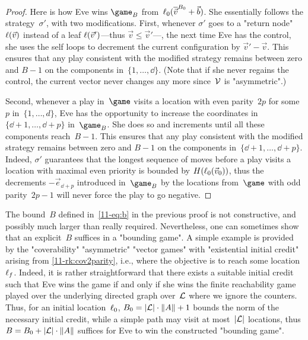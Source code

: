\begin{proof}
  Here is how Eve wins $\game_B$ from~$\loc_0(\capp[B_0]v+\vec b)$.
  She essentially follows the strategy~$\sigma'$, with two
  modifications.  First, whenever $\sigma'$ goes to a "return node"
  $\loc(\vec v)$ instead of a leaf $\loc(\vec v')$---thus $\vec
  v\leq\vec v'$---, the next time Eve has the control, she uses the
  self loops to decrement the current configuration by $\vec v'-\vec
  v$.  This ensures that any play consistent with the modified
  strategy remains between zero and $B-1$ on the components
  in~$\{1,\dots,\dd\}$.  (Note that if she never regains the control,
  the current vector never changes any more since~$\?V$ is
  "asymmetric".)

  Second, whenever a play in~$\game$ visits a location with even
  parity~$2p$ for some~$p$ in~$\{1,\dots,d\}$, Eve has the opportunity
  to increase the coordinates in~$\{\dd+1,\dots,\dd+p\}$ in~$\game_B$.
  She does so and increments until all these components reach~$B-1$.
  This ensures that any play consistent with the modified strategy
  remains between zero and $B-1$ on the components
  in~$\{\dd+1,\dots,\dd+p\}$.  Indeed, $\sigma'$ guarantees that the
  longest sequence of moves before a play visits a location with
  maximal even priority is bounded by $H(\loc_0(\vec v_0))$, thus the
  decrements $-\vec e_{\dd+p}$ introduced in~$\game_B$ by the
  locations from~$\game$ with odd parity~$2p-1$ will never force the
  play to go negative.
\end{proof}

The bound~$B$ defined in~\cref{11-eq:b} in the previous proof is not
constructive, and possibly much larger than really required.
Nevertheless, one can sometimes show that an explicit~$B$ suffices in
a "bounding game".
A simple example is provided by the "coverability" "asymmetric"
"vector games" with "existential initial credit" arising from
\cref{11-rk:cov2parity}, i.e., where the objective is to reach some
location~$\loc_f$.  Indeed, it is rather straightforward that there
exists a suitable initial credit such that Eve wins the game if and
only if she wins the finite reachability game played over the
underlying directed graph over~$\Loc$ where we ignore the counters.
Thus, for an initial location~$\loc_0$, $B_0=|\Loc|\cdot\|\Act\|+1$
bounds the norm of the necessary initial credit, while a simple path
may visit at most~$|\Loc|$ locations, thus
$B=B_0+|\Loc|\cdot\|\Act\|$ suffices for Eve to win the constructed
"bounding game".

